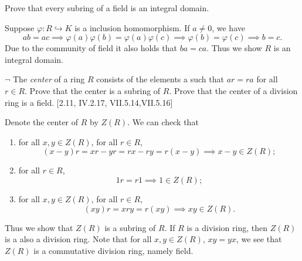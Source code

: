 \documentclass[12pt,letterpaper,boxed]{hmcpset}
\begin{document}
\begin{problem}[2.8]
	Prove that every subring of a field is an integral domain.
\end{problem}
\begin{solution}
	Suppose $\varphi:R\hookrightarrow K$ is a inclusion homomorphism. If $a\ne0$, we have
	\[
	ab=ac\implies \varphi(a)\varphi(b)=\varphi(a)\varphi(c)\implies \varphi(b)=\varphi(c)\implies b=c.
	\]
	Due to the community of field it also holds that $ba=ca$. Thus we show $R$ is an integral domain.
\end{solution}

\hypertarget{Exercise III.2.9}{}
\begin{problem}[2.9]
$\neg$ The \emph{center} of a ring $R$ consists of the elements a such that $ar = ra$ for all $r\in R$. Prove that the center is a subring of $R$. Prove that the center of a division ring is a field. [2.11, IV.2.17, VII.5.14,VII.5.16]
\end{problem}
\begin{solution}
Denote the center of $R$ by $Z(R)$. We can check that
\begin{enumerate}
	\item for all $x,y\in Z(R)$, for all $r\in R$, $$(x-y)r=xr-yr=rx-ry=r(x-y)\implies x-y\in Z(R);$$ 
	\item for all $r\in R$,
	\[
	1r=r1\implies 1\in Z(R);
	\]
	\item for all $x,y\in Z(R)$, for all $r\in R$,
	\[
	(xy)r=xry=r(xy)\implies xy\in Z(R).
	\]
\end{enumerate}
Thus we show that $Z(R)$ is a subring of $R$. If $R$ is a division ring, then $Z(R)$ is a also a division ring. Note that for all $x,y\in Z(R)$, $xy=yx$, we see that $Z(R)$ is a commutative division ring, namely field.
\end{solution}
\end{document}
